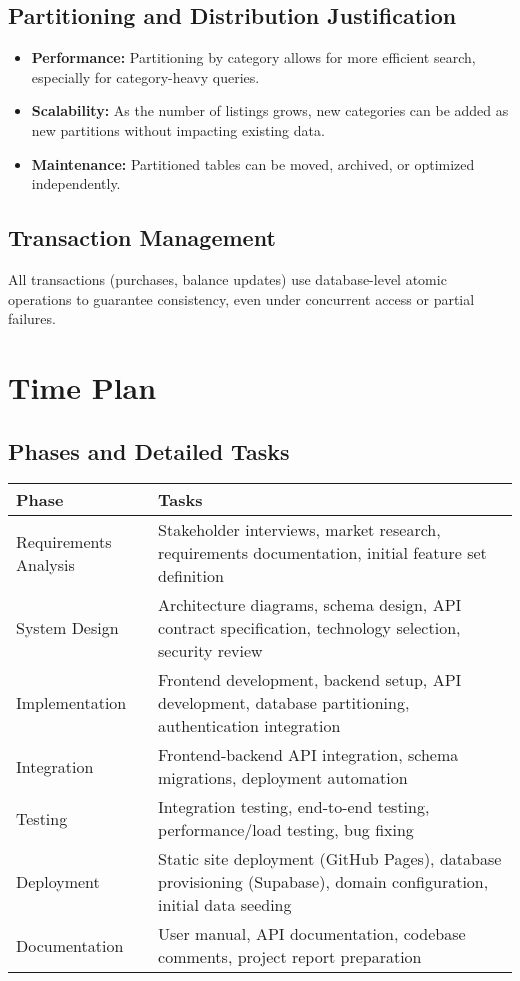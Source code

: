 \documentclass[12pt,a4paper]{report}
\begin{document}
\section{Partitioning and Distribution Justification}
\begin{itemize}
    \item \textbf{Performance:} Partitioning by category allows for more efficient search, especially for category-heavy queries.
    \item \textbf{Scalability:} As the number of listings grows, new categories can be added as new partitions without impacting existing data.
    \item \textbf{Maintenance:} Partitioned tables can be moved, archived, or optimized independently.
\end{itemize}

\section{Transaction Management}
All transactions (purchases, balance updates) use database-level atomic operations to guarantee consistency, even under concurrent access or partial failures.

\chapter{Time Plan}
\section{Phases and Detailed Tasks}
\begin{longtable}{|p{}|p{}|}
    \hline
    \textbf{Phase} & \textbf{Tasks} \\
    \hline
    Requirements Analysis & Stakeholder interviews, market research, requirements documentation, initial feature set definition \\
    \hline
    System Design & Architecture diagrams, schema design, API contract specification, technology selection, security review \\
    \hline
    Implementation & Frontend development, backend setup, API development, database partitioning, authentication integration \\
    \hline
    Integration & Frontend-backend API integration, schema migrations, deployment automation \\
    \hline
    Testing & Integration testing, end-to-end testing, performance/load testing, bug fixing \\
    \hline
    Deployment & Static site deployment (GitHub Pages), database provisioning (Supabase), domain configuration, initial data seeding \\
    \hline
    Documentation & User manual, API documentation, codebase comments, project report preparation \\
    \hline
\end{longtable}
\end{document}
